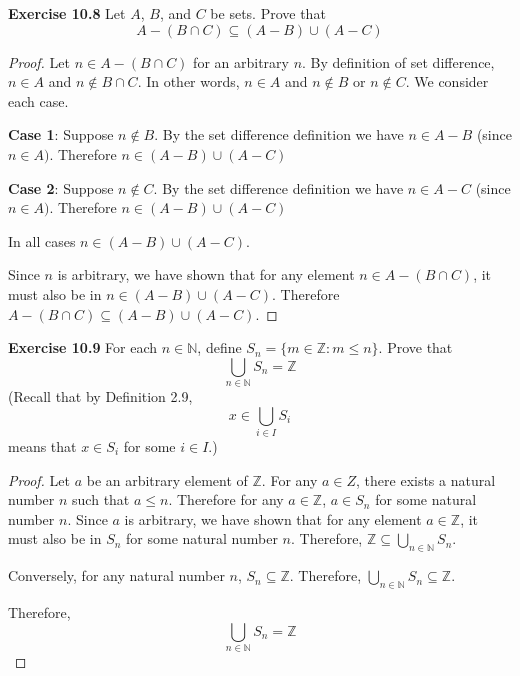 \documentclass[12pt,oneside]{article}
\newenvironment{exercise}[1]{\vspace{.1in}\noindent\textbf{Exercise #1 \hspace{.05em}}}{}
\newcommand{\Z}{\mathbb{Z}}
\newcommand{\N}{\mathbb{N}}
\begin{document}

\begin{exercise}{10.8}
Let $A$, $B$, and $C$ be sets. Prove that
\[A - (B \cap C) \subseteq (A - B) \cup (A - C)\]
\end{exercise}

\begin{proof}
Let $n \in A - (B \cap C)$ for an arbitrary $n$. By definition of set difference, $n \in A$ and $n \notin B \cap C$. In other words, $n \in A$ and $n \notin B$ or $n \notin C$. We consider each case.

\textbf{Case 1}: Suppose $n \notin B$. By the set difference definition we have $n \in A - B$ (since $n \in A)$. Therefore $n \in (A - B) \cup (A - C)$

\textbf{Case 2}: Suppose $n \notin C$. By the set difference definition we have $n \in A - C$ (since $n \in A)$. Therefore $n \in (A - B) \cup (A - C)$

In all cases $n \in (A - B) \cup (A - C)$.

Since $n$ is arbitrary, we have shown that for any element $n \in A - (B \cap C)$, it must also be in $n \in (A - B) \cup (A - C)$. Therefore $A - (B \cap C) \subseteq (A - B) \cup (A - C)$.
\end{proof}



\begin{exercise}{10.9}
For each $n \in \N$, define $S_n = \{m \in \Z: m \leq n\}$. Prove that
\[\bigcup_{n \in \N} S_n = \Z\]
(Recall that by Definition 2.9,
\[x \in \bigcup_{i \in I} S_i\]
means that $x \in S_i$ for some $i \in I$.)
\end{exercise}

\begin{proof}
Let $a$ be an arbitrary element of $\Z$. For any $a \in Z$, there exists a natural number $n$ such that $a \leq n$. Therefore for any $a \in \Z$, $a \in S_n$ for some natural number $n$. Since $a$ is arbitrary, we have shown that for any element $a \in \Z$, it must also be in $S_n$ for some natural number $n$. Therefore, $\Z \subseteq \bigcup_{n \in \N} S_n$.

Conversely, for any natural number $n$, $S_n \subseteq \Z$. Therefore, $\bigcup_{n \in \N} S_n \subseteq \Z$.

Therefore,
\[\bigcup_{n \in \N} S_n = \Z\]

\end{proof}


\end{document}
